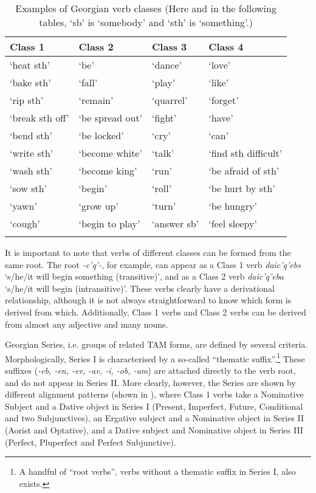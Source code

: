 \begin{table}
	\begin{tabular}{llll}
		\lsptoprule
		Class 1 & {Class 2} & {Class 3} & {Class 4} \\
		\midrule
		`heat sth' & `be' & `dance' & `love' \\
		`bake sth' & `fall' & `play' & `like' \\
		`rip sth' & `remain' & `quarrel' & `forget' \\
		`break sth off' & `be spread out' & `fight' & `have' \\
		`bend sth' & `be locked' & `cry' &  `can' \\
		`write sth' & `become white' & `talk' & `find sth difficult' \\
		`wash sth' & `become king' & `run' & `be afraid of sth' \\
		`sow sth' & `begin' & `roll' & `be hurt by sth' \\
		`yawn' &  `grow up' & `turn' & `be hungry' \\
		`cough' & `begin to play' & `answer sb' & `feel sleepy' \\
		\lspbottomrule
		
	\end{tabular}
	\caption{Examples of Georgian verb classes (Here and in the following tables, `sb' is `somebody' and `sth' is `something'.)}
	\label{verbderiv-table-georgianverbclassexamples}
\end{table}

It is important to note that verbs of different classes can be formed from the same root. The root \textit{-c'q'-}, for example, can appear as a Class 1 verb \textit{daic'q'ebs} `s/he/it will begin something (transitive)', and as a Class 2 verb \textit{daic'q'eba} `s/he/it will begin (intransitive)'. These verbs clearly have a derivational relationship, although it is not always straightforward to know which form is derived from which. Additionally, Class 1 verbs and Class 2 verbs can be derived from almost any adjective and many nouns.

Georgian Series, i.e. groups of related TAM forms, are defined by several criteria. Morphologically, Series I  is characterised by a so-called “thematic suffix”.\footnote{A handful of “root verbs”, verbs without a thematic suffix in Series I, also exists.} These suffixes (\textit{-eb, -en, -ev, -av, -i, -ob, -am}) are attached directly to the verb root, and do not appear in Series II. More clearly, however, the Series are shown by different alignment patterns (shown in ), where Class 1 verbs take a Nominative Subject and a Dative object in Series I (Present, Imperfect, Future, Conditional and two Subjunctives), an Ergative subject and a Nominative object in Series II (Aorist and Optative), and a Dative subject and Nominative object in Series III (Perfect, Pluperfect and Perfect Subjunctive).

